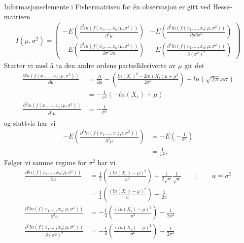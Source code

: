 \documentclass[12pt,
               a4paper,
               article,
               oneside,
               oldfontcommands,
               norsk]{memoir}
\begin{document}
Informasjonselemente i Fishermatrisen for én observasjon er gitt ved Hesse-matrisen
\begin{align*}
    I(\mu, \sigma^2) = 
    \begin{pmatrix}
        -E \left(\frac{\partial^2 ln(f(x_1, \ldots, x_n; \mu, \sigma^2))}{\partial^2 \mu} \right) & -E \left( \frac{\partial^2 ln(f(x_1, \ldots, x_n; \mu, \sigma^2))}{\partial \mu \partial \sigma^2} \right) \\[5pt]
       -E \left(\frac{\partial^2 ln(f(x_1, \ldots, x_n; \mu, \sigma^2))}{\partial \sigma^2 \partial u} \right) & -E \left( \frac{\partial^2 ln(f(x_1, \ldots, x_n; \mu, \sigma^2))}{\partial (\sigma^2)^2} \right)
    \end{pmatrix}
\end{align*}
Starter vi med å ta den andre ordens partiellderiverte av $\mu$ gir det
\begin{align*}
    \frac{\partial ln(f(x_1, \ldots, x_n; \mu, \sigma^2))}{\partial \mu} &= \frac{\partial}{\partial \mu} - \left( \frac{ln(X_i)^2 - 2ln(X_i)\mu + \mu^2}{2 \sigma^2}\right) - ln(\sqrt{2 \pi} x \sigma) \\[7pt]
    &= - \frac{1}{\sigma^2} \left(- ln(X_i) + \mu \right) \\[7pt]
    \frac{\partial^2 ln(f(x_1, \ldots, x_n; \mu, \sigma^2))}{\partial^2 \mu} &= - \frac{1}{\sigma^2}
\end{align*}
og sluttvis har vi
\begin{align*}
    -E \left(\frac{\partial^2 ln(f(x_1, \ldots, x_n; \mu, \sigma^2))}{\partial^2 \mu} \right) &= -E(- \frac{1}{\sigma^2})\\[7pt]
                        &= \frac{1}{\sigma^2}.
\end{align*}
Følger vi samme regime for $\sigma^2$ har vi 
\begin{align*}
    \frac{\partial ln(f(x_1, \ldots, x_n; \mu, \sigma^2))}{\partial u} &= \frac{1}{2} \left( \frac{(ln(X_i) - \mu)^2}{u^2} \right) + \frac{1}{2\sqrt{u}}\frac{1}{\sqrt{u}} \qquad ; \qquad \boxed{u = \sigma^2} \\[7pt]
    &= \frac{1}{2} \left( \frac{(ln(X_i) - \mu)^2}{u} \right) - \frac{1}{2u} \\[7pt]
    \frac{\partial^2 ln(f(x_1, \ldots, x_n; \mu, \sigma^2))}{\partial^2 u}&= -\frac{1}{4} \left( \frac{(ln(X_i) - \mu)^2}{u^3} \right)  - \frac{1}{2u^2} \\[7pt]
    \frac{\partial^2 ln(f(x_1, \ldots, x_n; \mu, \sigma^2))}{\partial (\sigma^2)^2}&= -\frac{1}{4} \left( \frac{(ln(X_i) - \mu)^2}{\sigma^6} \right)  - \frac{1}{2\sigma^4} \\[7pt]
\end{align*}
\end{document}
